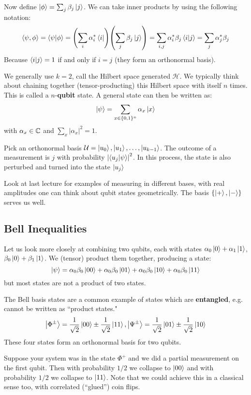 Now define $\ket{\phi} = \sum_j \beta_j \ket{j}$. We can take inner products by using the following notation:
\[ \langle \psi, \phi \rangle = \braket{\psi}{\phi} = \qty(\sum_{i} \alpha_i^* \bra{i})\qty(\sum_{j} \beta_j \ket{j}) = \sum_{i,j} \alpha_i^* \beta_j \braket{i}{j} = \sum_{j} \alpha_j^* \beta_j\]
Because $\braket{i}{j} = 1$ if and only if $i = j$ (they form an orthonormal basis).

We generally use $k = 2$, call the Hilbert space generated $\mathcal{H}$. We typically think about chaining together (tensor-producting)
this Hilbert space with itself $n$ times. This is called a $n$-\textbf{qubit} state. A general state can then be written as:
\[ \ket{\psi} = \sum_{x \in \{0, 1\}^n} \alpha_x \ket{x} \]
with $\alpha_x \in \operatorname{\mathbb{C}}$ and $\sum_{x} |\alpha_x|^2 = 1$.

\begin{note}
    Pick an orthonormal basis $\mathcal{U} = \ket{u_0}, \ket{u_1}, \dots, \ket{u_{k - 1}}$. The outcome of a measurement is $j$ with
    probability $\qty|\braket{u_j}{\psi}|^2$. In this process, the state is also perturbed and turned into the state $\ket{u_j}$
\end{note}

Look at last lecture for examples of measuring in different bases, with real amplitudes one can think about qubit states geometrically.
The basis $\{ \ket{+}, \ket{-} \}$ serves us well.

\subsection{Bell Inequalities}
Let us look more closely at combining two qubits, each with states $\alpha_0 \ket{0} + \alpha_1 \ket{1}$, $\beta_0 \ket{0} + \beta_1 \ket{1}$.
We (tensor) product them together, producing a state:
\[ \ket{\psi} = \alpha_0 \beta_0 \ket{00} + \alpha_0 \beta_0 \ket{01} + \alpha_0 \beta_0 \ket{10} + \alpha_0 \beta_0 \ket{11} \]
but most states are not a product of two states.

The Bell basis states are a common example of states which are \textbf{entangled}, e.g. cannot be written as ``product states."
\[ \ket{\Phi^{\pm}} = \frac{1}{\sqrt{2}} \ket{00} \pm \frac{1}{\sqrt{2}} \ket{11}, \ket{\Psi^{\pm}} = \frac{1}{\sqrt{2}} \ket{01} \pm \frac{1}{\sqrt{2}} \ket{10}  \]
These four states form an orthonormal basis for two qubits.

Suppose your system was in the state $\Phi^+$ and we did a partial measurement on the first qubit.
Then with probability $1/2$ we collapse to $\ket{00}$ and with probability $1/2$ we collapse to $\ket{11}$. Note that we could achieve this
in a classical sense too, with correlated (``glued'') coin flips.

